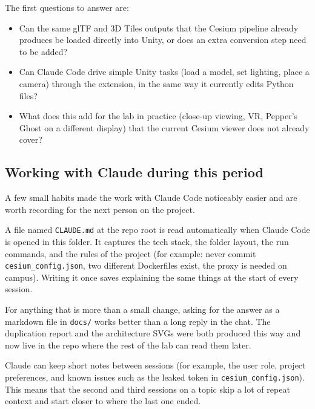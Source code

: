 \documentclass[a4paper,12pt]{article}
\begin{document}
The first questions to answer are:
\begin{itemize}
    \item Can the same glTF and 3D Tiles outputs that the Cesium pipeline already produces be loaded directly into Unity, or does an extra conversion step need to be added?
    \item Can Claude Code drive simple Unity tasks (load a model, set lighting, place a camera) through the extension, in the same way it currently edits Python files?
    \item What does this add for the lab in practice (close-up viewing, VR, Pepper's Ghost on a different display) that the current Cesium viewer does not already cover?
\end{itemize}

\subsection{Working with Claude during this period}
A few small habits made the work with Claude Code noticeably easier and are worth recording for the next person on the project.

\begin{tcolorbox}[title=Project context lives in CLAUDE.md]
A file named \texttt{CLAUDE.md} at the repo root is read automatically when Claude Code is opened in this folder. It captures the tech stack, the folder layout, the run commands, and the rules of the project (for example: never commit \texttt{cesium\_config.json}, two different Dockerfiles exist, the proxy is needed on campus). Writing it once saves explaining the same things at the start of every session.
\end{tcolorbox}

\begin{tcolorbox}[title=Reports as .md files instead of long chat answers]
For anything that is more than a small change, asking for the answer as a markdown file in \texttt{docs/} works better than a long reply in the chat. The duplication report and the architecture SVGs were both produced this way and now live in the repo where the rest of the lab can read them later.
\end{tcolorbox}

\begin{tcolorbox}[title=Memory across sessions]
Claude can keep short notes between sessions (for example, the user role, project preferences, and known issues such as the leaked token in \texttt{cesium\_config.json}). This means that the second and third sessions on a topic skip a lot of repeat context and start closer to where the last one ended.
\end{tcolorbox}
\end{document}
